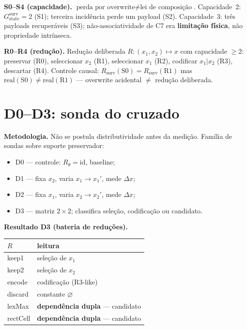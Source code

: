 \documentclass[11pt,a4paper]{article}
\begin{document}
\medskip\noindent\textbf{S0--S4 (capacidade).}
$\text{perda por overwrite}\neq\text{lei de composição}$. Capacidade~2: $G_{\mathrm{state}}^{\mathrm{surv}}=2$
(S1); terceira incidência perde um payload (S2). Capacidade~3: três payloads recuperáveis (S3);
não-associatividade de C7 era \textbf{limitação física}, não propriedade intrínseca.

\medskip\noindent\textbf{R0--R4 (redução).} Redução deliberada $R\colon(x_1,x_2)\mapsto x$ com
capacidade $\ge2$: preservar (R0), seleccionar $x_2$ (R1), seleccionar $x_1$ (R2),
codificar $x_1|x_2$ (R3), descartar (R4). Controle causal:
$R_{\mathrm{surv}}(\mathrm{S0})=R_{\mathrm{surv}}(\mathrm{R1})$ mas
$\mathrm{real}(\mathrm{S0})\neq\mathrm{real}(\mathrm{R1})$ --- overwrite acidental
$\neq$ redução deliberada.

\section{D0--D3: sonda do cruzado}\label{comb:d}

\noindent\textbf{Metodologia.} Não se postula distributividade antes da medição.
Família de sondas sobre suporte preservador:
\begin{itemize}\itemsep2pt
\item D0 --- controle: $R_\theta=\mathrm{id}$, baseline;
\item D1 --- fixa $x_2$, varia $x_1\to x_1'$, mede $\Delta x$;
\item D2 --- fixa $x_1$, varia $x_2\to x_2'$, mede $\Delta x$;
\item D3 --- matriz $2\times2$; classifica seleção, codificação ou candidato.
\end{itemize}

\medskip\noindent\textbf{Resultado D3 (bateria de reduções).}
\begin{center}\footnotesize
\begin{tabular}{@{}ll@{}}
\toprule
$R$ & leitura \\
\midrule
keep1 & seleção de $x_1$ \\
keep2 & seleção de $x_2$ \\
encode & codificação (R3-like) \\
discard & constante $\varnothing$ \\
lexMax & \textbf{dependência dupla} --- candidato \\
rectCell & \textbf{dependência dupla} --- candidato \\
\bottomrule
\end{tabular}
\end{center}
\end{document}
